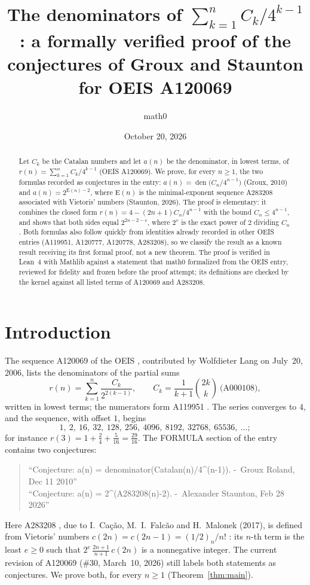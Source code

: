 \documentclass[11pt]{amsart}
\title[Denominators of partial sums of $C_k/4^{k-1}$]{The denominators of $\sum_{k=1}^{n} C_k/4^{k-1}$: a formally verified proof of the conjectures of Groux and Staunton for OEIS A120069}
\author{math0}
\date{October 20, 2026}
\theoremstyle{plain}
\theoremstyle{definition}
\DeclareMathOperator{\den}{den}
\newcommand{\E}{\mathrm{E}}
\begin{document}
\begin{abstract}
Let $C_k$ be the Catalan numbers and let $a(n)$ be the denominator, in lowest terms, of $r(n)=\sum_{k=1}^{n}C_k/4^{k-1}$ (OEIS A120069). We prove, for every $n\ge1$, the two formulas recorded as conjectures in the entry: $a(n)=\den\bigl(C_n/4^{n-1}\bigr)$ (Groux, 2010) and $a(n)=2^{\E(n)-2}$, where $\E(n)$ is the minimal-exponent sequence A283208 associated with Vietoris' numbers (Staunton, 2026). The proof is elementary: it combines the closed form $r(n)=4-(2n+1)C_n/4^{n-1}$ with the bound $C_n\le4^{n-1}$, and shows that both sides equal $2^{2n-2-v}$, where $2^v$ is the exact power of $2$ dividing $C_n$. Both formulas also follow quickly from identities already recorded in other OEIS entries (A119951, A120777, A120778, A283208), so we classify the result as a known result receiving its first formal proof, not a new theorem. The proof is verified in Lean~4 with Mathlib against a statement that math0 formalized from the OEIS entry, reviewed for fidelity and frozen before the proof attempt; its definitions are checked by the kernel against all listed terms of A120069 and A283208.
\end{abstract}
\maketitle

\section{Introduction}

The sequence A120069 of the OEIS \cite{A120069}, contributed by Wolfdieter Lang on July~20, 2006, lists the denominators of the partial sums
\[
  r(n)=\sum_{k=1}^{n}\frac{C_k}{2^{2(k-1)}},\qquad C_k=\frac{1}{k+1}\binom{2k}{k}\ \text{(A000108)},
\]
written in lowest terms; the numerators form A119951 \cite{A119951}. The series converges to $4$, and the sequence, with offset $1$, begins
\[
  1,\ 2,\ 16,\ 32,\ 128,\ 256,\ 4096,\ 8192,\ 32768,\ 65536,\ \dots;
\]
for instance $r(3)=1+\tfrac{2}{4}+\tfrac{5}{16}=\tfrac{29}{16}$. The FORMULA section of the entry contains two conjectures:
\begin{quote}
``Conjecture: a(n) = denominator(Catalan(n)/4\textasciicircum{}(n-1)). -{}~Groux Roland, Dec 11 2010''\\
``Conjecture: a(n) = 2\textasciicircum{}(A283208(n)-2). -{}~Alexander Staunton, Feb 28 2026''
\end{quote}
Here A283208 \cite{A283208}, due to I.~Cação, M.~I.~Falcão and H.~Malonek (2017), is defined from Vietoris' numbers $c(2n)=c(2n-1)=(1/2)_n/n!$ \cite{Vie,CFM}: its $n$-th term is the least $e\ge0$ such that $2^{e}\,\frac{2n+1}{n+1}\,c(2n)$ is a nonnegative integer. The current revision of A120069 (\#30, March~10, 2026) still labels both statements as conjectures. We prove both, for every $n\ge1$ (Theorem~\ref{thm:main}).
\end{document}
